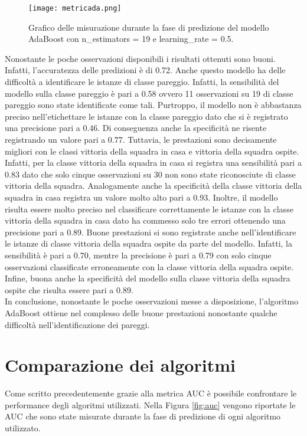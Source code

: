 \begin{figure}[]
	\begin{center}
		\texttt{[image: metricada.png]}
		\caption{Grafico delle misurazione durante la fase di predizione del modello AdaBoost con \textsf{n\_estimators} = 19 e \textsf{learning\_rate} = 0.5.
		} 
		\label{fig:adametrics}
	\end{center}
\end{figure}
Nonostante le poche osservazioni disponibili i risultati ottenuti sono buoni. Infatti, l'accuratezza delle predizioni è di 0.72. Anche questo modello ha delle difficoltà a identificare le istanze di classe pareggio. Infatti, la sensibilità del modello sulla classe pareggio è pari a 0.58 ovvero 11 osservazioni su 19 di classe pareggio sono state identificate come tali. Purtroppo, il modello non è abbastanza preciso nell’etichettare le istanze con la classe pareggio dato che si è registrato una precisione pari a 0.46. Di conseguenza anche la specificità ne risente registrando un valore pari a 0.77. Tuttavia, le prestazioni sono decisamente migliori con le classi vittoria della squadra in casa e vittoria della squadra ospite. Infatti, per la classe vittoria della squadra in casa si registra una sensibilità pari a 0.83 dato che solo cinque osservazioni su 30 non sono state riconosciute di classe vittoria della squadra. Analogamente anche la specificità della classe vittoria della squadra in casa registra un valore molto alto pari a 0.93. Inoltre, il modello risulta essere molto preciso nel classificare correttamente le istanze con la classe vittoria della squadra in casa dato ha commesso solo tre errori ottenendo una precisione pari a 0.89. Buone prestazioni si sono registrate anche nell'identificare le istanze di classe vittoria della squadra ospite da parte del modello. Infatti, la sensibilità è pari a 0.70, mentre la precisione è pari a 0.79 con solo cinque osservazioni classificate erroneamente con la classe vittoria della squadra ospite. Infine, buona anche la specificità del modello sulla classe vittoria della squadra ospite che risulta essere pari a 0.89.\\
In conclusione, nonostante le poche osservazioni messe a disposizione, l'algoritmo AdaBoost ottiene nel complesso delle buone prestazioni nonostante qualche difficoltà nell’identificazione dei pareggi.

\section{Comparazione dei algoritmi}
Come scritto precedentemente grazie alla metrica AUC è possibile confrontare le performance degli algoritmi utilizzati. 
Nella Figura \ref{fig:auc} vengono riportate le AUC che sono state misurate durante la fase di predizione di ogni algoritmo utilizzato.

